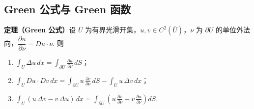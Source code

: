 \documentclass{article}
\begin{document}
\subsection{Green 公式与 Green 函数}

\noindent\textbf{定理（Green 公式）}\quad 设 $U$ 为有界光滑开集，$u, v \in C^2(\bar{U})$，$\nu$ 为 $\partial U$ 的单位外法向，$\dfrac{\partial u}{\partial \nu} = Du \cdot \nu$. 则
\begin{enumerate}[label=\arabic*$^\circ$, left=0pt]
	
	\item $\displaystyle\int_U \Delta u\, dx = \int_{\partial U} \frac{\partial u}{\partial \nu}\, dS$；
	\item $\displaystyle\int_U Du \cdot Dv\, dx = \int_{\partial U} u\, \frac{\partial v}{\partial \nu}\, dS - \int_U u\, \Delta v\, dx$；
	\item $\displaystyle\int_U (u\, \Delta v - v\, \Delta u)\, dx = \int_{\partial U} \left( u\, \frac{\partial v}{\partial \nu} - v\, \frac{\partial u}{\partial \nu} \right) dS$.
\end{enumerate}
\end{document}
